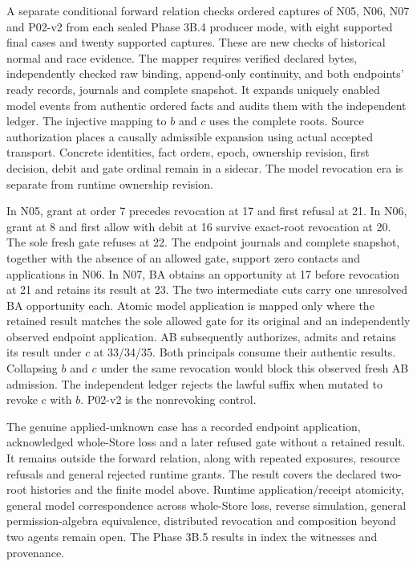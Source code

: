 \documentclass[11pt,a4paper]{article}
\theoremstyle{definition}
\theoremstyle{remark}
\begin{document}
A separate conditional forward relation checks ordered captures of N05, N06, N07 and P02-v2 from each sealed Phase 3B.4 producer mode, with eight supported final cases and twenty supported captures. These are new checks of historical normal and race evidence. The mapper requires verified declared bytes, independently checked raw binding, append-only continuity, and both endpoints' ready records, journals and complete snapshot. It expands uniquely enabled model events from authentic ordered facts and audits them with the independent ledger. The injective mapping to $b$ and $c$ uses the complete roots. Source authorization places a causally admissible expansion using actual accepted transport. Concrete identities, fact orders, epoch, ownership revision, first decision, debit and gate ordinal remain in a sidecar. The model revocation era is separate from runtime ownership revision.

In N05, grant at order 7 precedes revocation at 17 and first refusal at 21. In N06, grant at 8 and first allow with debit at 16 survive exact-root revocation at 20. The sole fresh gate refuses at 22. The endpoint journals and complete snapshot, together with the absence of an allowed gate, support zero contacts and applications in N06. In N07, BA obtains an opportunity at 17 before revocation at 21 and retains its result at 23. The two intermediate cuts carry one unresolved BA opportunity each. Atomic model application is mapped only where the retained result matches the sole allowed gate for its original and an independently observed endpoint application. AB subsequently authorizes, admits and retains its result under $c$ at 33/34/35. Both principals consume their authentic results. Collapsing $b$ and $c$ under the same revocation would block this observed fresh AB admission. The independent ledger rejects the lawful suffix when mutated to revoke $c$ with $b$. P02-v2 is the nonrevoking control.

The genuine applied-unknown case has a recorded endpoint application, acknowledged whole-Store loss and a later refused gate without a retained result. It remains outside the forward relation, along with repeated exposures, resource refusals and general rejected runtime grants. The result covers the declared two-root histories and the finite model above. Runtime application/receipt atomicity, general model correspondence across whole-Store loss, reverse simulation, general permission-algebra equivalence, distributed revocation and composition beyond two agents remain open. The Phase 3B.5 results in  index the witnesses and provenance.
\end{document}
